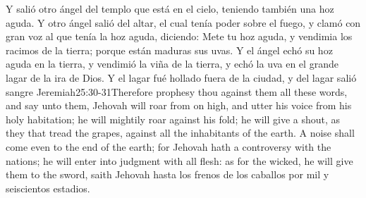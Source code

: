 Y salió otro ángel del templo que está en el cielo, teniendo también una hoz aguda. 
Y otro ángel salió del altar, el cual tenía poder sobre el fuego, y clamó con gran voz al que tenía la hoz aguda, diciendo: Mete tu hoz aguda, y vendimia los racimos de la tierra; porque están maduras sus uvas. 
Y el ángel echó su hoz aguda en la tierra, y vendimió la viña de la tierra, y echó la uva en el grande lagar de la ira de Dios.
Y el lagar fué hollado fuera de la ciudad, y del lagar salió sangre%
				{Jeremiah}{25:30-31}{Therefore prophesy thou against them all these words, and say unto them, Jehovah will roar from on high, and utter his voice from his holy habitation; he will mightily roar against his fold; he will give a shout, as they that tread the grapes, against all the inhabitants of the earth. A noise shall come even to the end of the earth; for Jehovah hath a controversy with the nations; he will enter into judgment with all flesh: as for the wicked, he will give them to the sword, saith Jehovah}
 hasta los frenos de los caballos por mil y seiscientos estadios.
